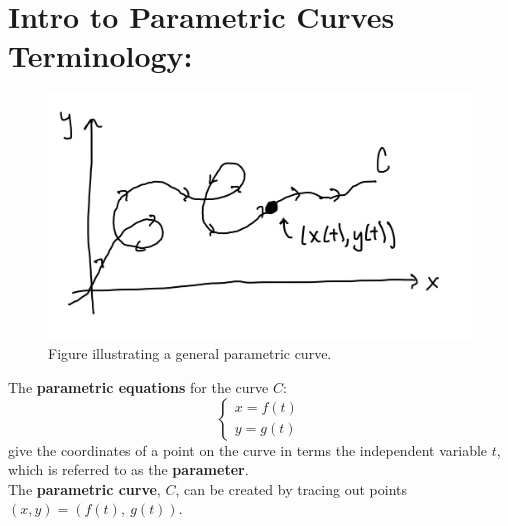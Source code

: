 \setlength{\columnseprule}{0.4pt}
\setlength{\columnsep}{3em}


\section*{Intro to Parametric Curves Terminology:}


\begin{figure}[!h]
\includegraphics[width=\textwidth]{parametric-curve.jpeg}
\caption{Figure illustrating a general parametric curve.}
\end{figure}




 
 The \textbf{parametric equations} for the curve \(C\): 
\[
\left\lbrace\begin{matrix}
x = f(t)\\
y = g(t)
\end{matrix}
\right.
\]
give the coordinates of a point on the curve in terms the independent variable \(t\), which is referred to as the \textbf{parameter}. \\

The \textbf{parametric curve}, \(C\), can be created by tracing out points
 \((x, y) = (f(t),\ g(t))\). \\

